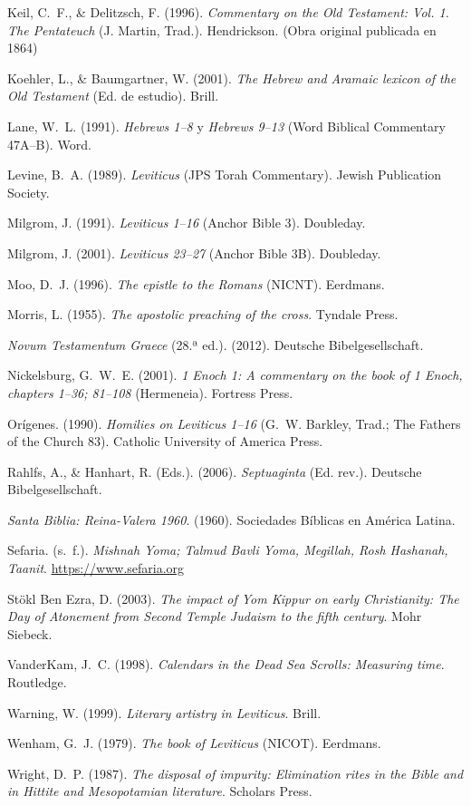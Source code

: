 \documentclass[11pt,letterpaper]{article}
\newcommand{\refapa}[1]{\par{\RaggedRight\hangindent=1.27cm\hangafter=1\noindent #1\par}\vspace{4pt}}
\begin{document}
\refapa{Keil, C.~F., \& Delitzsch, F. (1996). \emph{Commentary on the Old Testament: Vol. 1. The Pentateuch} (J. Martin, Trad.). Hendrickson. (Obra original publicada en 1864)}
\refapa{Koehler, L., \& Baumgartner, W. (2001). \emph{The Hebrew and Aramaic lexicon of the Old Testament} (Ed. de estudio). Brill.}
\refapa{Lane, W.~L. (1991). \emph{Hebrews 1--8} y \emph{Hebrews 9--13} (Word Biblical Commentary 47A--B). Word.}
\refapa{Levine, B.~A. (1989). \emph{Leviticus} (JPS Torah Commentary). Jewish Publication Society.}
\refapa{Milgrom, J. (1991). \emph{Leviticus 1--16} (Anchor Bible 3). Doubleday.}
\refapa{Milgrom, J. (2001). \emph{Leviticus 23--27} (Anchor Bible 3B). Doubleday.}
\refapa{Moo, D.~J. (1996). \emph{The epistle to the Romans} (NICNT). Eerdmans.}
\refapa{Morris, L. (1955). \emph{The apostolic preaching of the cross}. Tyndale Press.}
\refapa{\emph{Novum Testamentum Graece} (28.ª ed.). (2012). Deutsche Bibelgesellschaft.}
\refapa{Nickelsburg, G.~W.~E. (2001). \emph{1 Enoch 1: A commentary on the book of 1 Enoch, chapters 1--36; 81--108} (Hermeneia). Fortress Press.}
\refapa{Orígenes. (1990). \emph{Homilies on Leviticus 1--16} (G.~W. Barkley, Trad.; The Fathers of the Church 83). Catholic University of America Press.}
\refapa{Rahlfs, A., \& Hanhart, R. (Eds.). (2006). \emph{Septuaginta} (Ed. rev.). Deutsche Bibelgesellschaft.}
\refapa{\emph{Santa Biblia: Reina-Valera 1960}. (1960). Sociedades Bíblicas en América Latina.}
\refapa{Sefaria. (s.~f.). \emph{Mishnah Yoma; Talmud Bavli Yoma, Megillah, Rosh Hashanah, Taanit}. \url{https://www.sefaria.org}}
\refapa{Stökl Ben Ezra, D. (2003). \emph{The impact of Yom Kippur on early Christianity: The Day of Atonement from Second Temple Judaism to the fifth century}. Mohr Siebeck.}
\refapa{VanderKam, J.~C. (1998). \emph{Calendars in the Dead Sea Scrolls: Measuring time}. Routledge.}
\refapa{Warning, W. (1999). \emph{Literary artistry in Leviticus}. Brill.}
\refapa{Wenham, G.~J. (1979). \emph{The book of Leviticus} (NICOT). Eerdmans.}
\refapa{Wright, D.~P. (1987). \emph{The disposal of impurity: Elimination rites in the Bible and in Hittite and Mesopotamian literature}. Scholars Press.}
\end{document}
